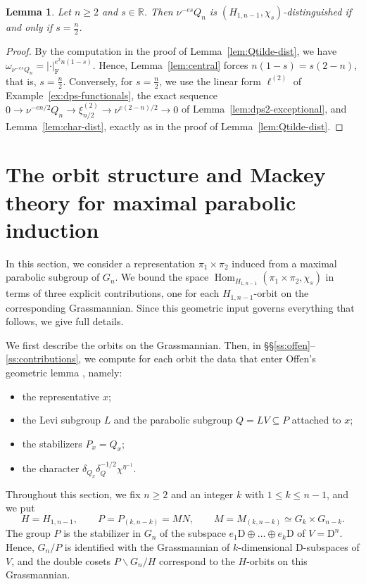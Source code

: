 \documentclass[11pt]{amsart}
\numberwithin{equation}{section}
\theoremstyle{plain}
\newtheorem{lemma}[theorem]{Lemma}
\theoremstyle{definition}
\theoremstyle{remark}
\newcommand{\R}{\mathbb{R}}
\DeclareMathOperator{\Hom}{Hom}
\newcommand{\xitwo}{\xi^{(2)}}
\begin{document}
\begin{lemma}\label{lem:Q-dist}
	Let $n\ge2$ and $s\in\R$. Then $\nu^{-es}Q_n$ is $(H_{1,n-1},\chi_s)$-distinguished if and only if $s=\frac n2$.
\end{lemma}

\begin{proof}
	By the computation in the proof of Lemma~\ref{lem:Qtilde-dist}, we have $\omega_{\nu^{-es}Q_n}=|\cdot|_{\mathrm{F}}^{e^2n(1-s)}$. Hence, Lemma~\ref{lem:central} forces $n(1-s)=s(2-n)$, that is, $s=\frac n2$. Conversely, for $s=\frac n2$, we use the linear form $\ell^{(2)}$ of Example~\ref{ex:dps-functionals}, the exact sequence $0\to\nu^{-en/2}Q_n\to\xitwo_{n/2}\to\nu^{e(2-n)/2}\to0$ of Lemma~\ref{lem:dps2-exceptional}, and Lemma~\ref{lem:char-dist}, exactly as in the proof of Lemma~\ref{lem:Qtilde-dist}.
\end{proof}

\section{The orbit structure and Mackey theory for maximal parabolic induction}\label{sec:orbits}

In this section, we consider a representation $\pi_1\times\pi_2$ induced from a maximal parabolic subgroup of $G_n$. We bound the space $\Hom_{H_{1,n-1}}(\pi_1\times\pi_2,\chi_s)$ in terms of three explicit contributions, one for each $H_{1,n-1}$-orbit on the corresponding Grassmannian. Since this geometric input governs everything that follows, we give full details.

We first describe the orbits on the Grassmannian. Then, in \S\S\ref{ss:offen}--\ref{ss:contributions}, we compute for each orbit the data that enter Offen's geometric lemma \cite[Proposition 4.1]{Off17}, namely:
\begin{itemize}
	\item the representative $x$;
	\item the Levi subgroup $L$ and the parabolic subgroup $Q=LV\subseteq P$ attached to $x$;
	\item the stabilizers $P_x=Q_x$;
	\item the character $\delta_{Q_x}\delta_Q^{-1/2}\chi^{\eta^{-1}}$.
\end{itemize}

Throughout this section, we fix $n\ge2$ and an integer $k$ with $1\le k\le n-1$, and we put
$$
H=H_{1,n-1},\qquad P=P_{(k,n-k)}=MN,\qquad M=M_{(k,n-k)}\simeq G_k\times G_{n-k}.
$$
The group $P$ is the stabilizer in $G_n$ of the subspace $e_1\mathrm{D}\oplus\dots\oplus e_k\mathrm{D}$ of $V=\mathrm{D}^n$. Hence, $G_n/P$ is identified with the Grassmannian of $k$-dimensional $\mathrm{D}$-subspaces of $V$, and the double cosets $P\backslash G_n/H$ correspond to the $H$-orbits on this Grassmannian.
\end{document}
